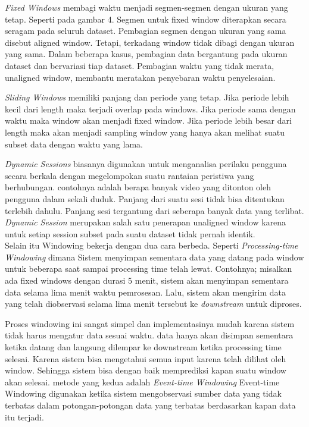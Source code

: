 \documentclass[a4paper,twoside]{article}
\begin{document}
\begin{enumerate}
\begin{itemize}
{			\textit{Fixed Windows} membagi waktu menjadi segmen-segmen dengan ukuran yang tetap. 					Seperti pada gambar 4. Segmen untuk fixed window diterapkan secara seragam pada seluruh 				dataset. Pembagian segmen dengan ukuran yang sama disebut aligned window. Tetapi, 						terkadang window tidak dibagi dengan ukuran yang sama. Dalam beberapa kasus, pembagian 					data bergantung pada ukuran dataset dan bervariasi tiap dataset. Pembagian waktu yang 					tidak merata, unaligned window, membantu 	meratakan penyebaran waktu penyelesaian.
			
			\textit{Sliding Windows} memiliki panjang dan periode yang tetap. Jika periode lebih 					kecil dari length maka terjadi overlap pada windows. Jika periode sama dengan waktu maka 			window akan menjadi fixed window. Jika periode lebih besar dari length maka akan menjadi 			sampling window yang hanya akan melihat suatu subset data dengan waktu yang lama.
			
			\textit{Dynamic Sessions} biasanya digunakan untuk menganalisa perilaku pengguna secara 				berkala dengan megelompokan suatu rantaian peristiwa yang berhubungan. contohnya adalah 				berapa banyak video yang ditonton oleh pengguna dalam sekali duduk. Panjang dari suatu 					sesi tidak bisa ditentukan terlebih dahulu. Panjang sesi tergantung dari seberapa banyak 			data yang terlibat. \textit{Dynamic Session} merupakan salah satu penerapan unaligned 
			window 	karena untuk setiap session subset pada suatu dataset tidak pernah identik.\\
			
			Selain itu Windowing bekerja dengan dua cara berbeda. Seperti \textit{Processing-time 
	Windowing} dimana Sistem menyimpan sementara data yang datang pada window untuk beberapa saat 
	sampai processing time telah lewat. Contohnya; misalkan ada fixed windows dengan durasi 5 			
	menit, sistem akan menyimpan sementara data selama lima menit waktu pemrosesan. Lalu, 			 
	sistem akan mengirim data yang telah diobservasi selama lima menit tersebut ke 				 
	\textit{downstream} untuk diproses.
	
	Proses windowing ini sangat simpel dan implementasinya mudah karena sistem tidak harus 		 
	mengatur data sesuai waktu. data hanya akan disimpan sementara ketika datang dan 				 
	langsung dilempar ke downstream ketika processing time selesai. Karena sistem bisa 			 
	mengetahui semua input karena telah dilihat oleh window. Sehingga sistem bisa dengan 			 
	baik memprediksi kapan suatu window akan selesai. metode yang kedua adalah \textit{Event-time 
	Windowing} Event-time Windowing digunakan ketika sistem mengobservasi sumber data yang tidak 
	terbatas dalam potongan-potongan data yang terbatas berdasarkan kapan data itu terjadi.
			}
		\end{itemize}\newpage
		

\end{enumerate}
\end{document}
